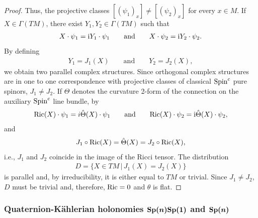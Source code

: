 \documentclass[pdftex]{sigma}
\numberwithin{equation}{section}
\begin{document}
\begin{proof}
Thus, the projective classes $[(\psi_1)_x]\not=[(\psi_2)_x]$ for every $x\in M$. If $X\in \Gamma(TM)$, there exist $Y_1, Y_2\in \Gamma(TM)$ such that
\begin{gather*}X\cdot \psi_1= {\rm i} Y_1\cdot \psi_1\qquad\text{and}\qquad X\cdot \psi_2= {\rm i} Y_2\cdot \psi_2.
\end{gather*}
By defining
\begin{gather*}Y_1=J_1(X) \qquad\text{and}\qquad Y_2=J_2(X),
\end{gather*}
we obtain two parallel complex structures. Since orthogonal complex structures are in one to one correspondence with projective classes of classical ${\rm Spin}^c$ pure spinors, $J_1\not=J_2$. If $\Theta$ denotes the curvature 2-form of the connection on the auxiliary ${\rm Spin}^c$ line bundle, by~\cite{Moroianu}
\begin{gather*}{\rm Ric}(X)\cdot \psi_1=i\hat\Theta(X)\cdot \psi_1\qquad\text{and}\qquad {\rm Ric}(X)\cdot \psi_2={\rm i}\hat\Theta(X)\cdot \psi_2 ,\end{gather*}
and
\begin{gather*}J_1\circ {\rm Ric}(X) =\hat\Theta(X)=J_2\circ {\rm Ric}(X),\end{gather*}
i.e., $J_1$ and $J_2$ coincide in the image of the Ricci tensor. The distribution
\begin{gather*}D=\{X\in TM\,|\, J_1(X)=J_2(X)\}\end{gather*}
is parallel and, by irreducibility, it is either equal to $TM$ or trivial. Since $J_1\not = J_2$, $D$ must be trivial and, therefore, ${\rm Ric}=0$ and $\theta$ is flat.
\end{proof}

\subsubsection[Quaternion-K\"ahlerian holonomies ${\rm Sp}(n){\rm Sp}(1)$ and ${\rm Sp}(n)$]{Quaternion-K\"ahlerian holonomies $\boldsymbol{{\rm Sp}(n){\rm Sp}(1)}$ and $\boldsymbol{{\rm Sp}(n)}$}
\end{document}
